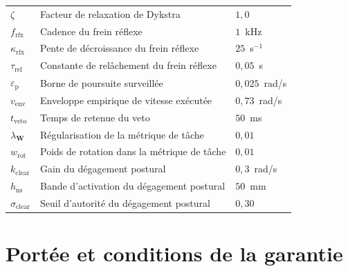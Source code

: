 \begin{table}[htpb]
\begin{tabular}{lll}
$\zeta$ & Facteur de relaxation de Dykstra & $1{,}0$ \\
$f_{\mathrm{rfx}}$ & Cadence du frein réflexe & $1$~kHz \\
$\kappa_{\mathrm{rfx}}$ & Pente de décroissance du frein réflexe & $25$~s$^{-1}$ \\
$\tau_{\mathrm{rel}}$ & Constante de relâchement du frein réflexe & $0{,}05$~s \\
$\varepsilon_{\mathrm{p}}$ & Borne de poursuite surveillée & $0{,}025$~rad/s \\
$v_{\mathrm{env}}$ & Enveloppe empirique de vitesse exécutée & $0{,}73$~rad/s \\
$t_{\mathrm{veto}}$ & Temps de retenue du veto & $50$~ms \\
$\lambda_{\mathbf{W}}$ & Régularisation de la métrique de tâche & $0{,}01$ \\
$w_{\mathrm{rot}}$ & Poids de rotation dans la métrique de tâche & $0{,}01$ \\
$k_{\mathrm{clear}}$ & Gain du dégagement postural & $0{,}3$~rad/s \\
$h_{\mathrm{ns}}$ & Bande d'activation du dégagement postural & $50$~mm \\
$\sigma_{\mathrm{clear}}$ & Seuil d'autorité du dégagement postural & $0{,}30$ \\
\hline
\end{tabular}
\end{table}

\section{Portée et conditions de la garantie}\label{subsec:garanties}
